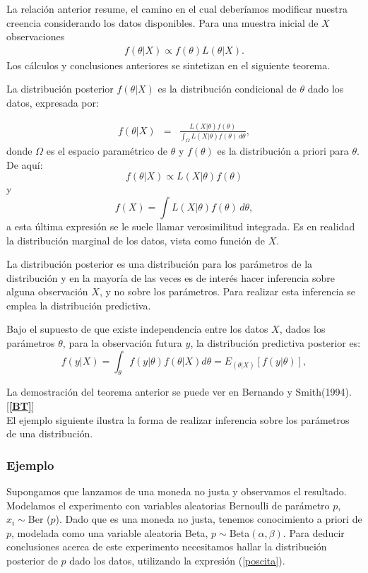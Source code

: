 \noindent La relaci\'on anterior resume, el camino en el cual deber\'iamos modificar nuestra creencia considerando los datos disponibles. Para una muestra inicial de $X$ observaciones 
\begin{eqnarray}
f(\theta|X)\propto f(\theta)L(\theta|X).\label{poscita}
\end{eqnarray}
\noindent Los c\'alculos y conclusiones anteriores se sintetizan en el siguiente teorema.
\begin{thm}
La distribuci\'on posterior $f(\theta|X)$ es la distribuci\'on condicional de $\theta$ dado los datos, expresada por:

\begin{eqnarray*}
f(\theta|X)&=&\frac{L(X|\theta)f(\theta)}{\int_{\Omega} L(X|\theta)f(\theta)\,d\theta},
\end{eqnarray*}
donde $\Omega$ es el espacio param\'etrico de $\theta$ y $f(\theta)$ es la distribuci\'on a priori para  $\theta$.\\[0.2cm]
De aqu\'i:
$$f(\theta|X)\propto L(X|\theta)f(\theta)$$
y
$$f(X)=\int L(X|\theta)f(\theta)\,d\theta,$$
a esta \'ultima expresi\'on se le suele llamar verosimilitud integrada. Es en realidad la distribuci\'on marginal de los datos, vista como funci\'on de $X$.
\end{thm}

\noindent La distribuci\'on posterior es  una distribuci\'on para los par\'ametros de la distribuci\'on y en la mayor\'ia de las veces es de inter\'es hacer inferencia sobre alguna observaci\'on $X$, y no sobre los par\'ametros. Para realizar esta inferencia se emplea la distribuci\'on predictiva.

 \begin{thm}
 Bajo el supuesto de que existe independencia entre los datos $X$, dados los par\'ametros $\theta$, para la observaci\'on futura $y$, la distribuci\'on predictiva posterior es:
 $$f(y|X)=\int_{\theta} f(y|\theta)f(\theta|X) d\theta=E_{(\theta|X)}[f(y|\theta)],$$
 \end{thm}

\noindent La demostraci\'on del teorema anterior se puede ver en Bernando y Smith(1994). [{\bf \ref{BT}}]\\[0.1cm]
\noindent El ejemplo siguiente ilustra la forma de realizar inferencia sobre los par\'ametros de una distribuci\'on.

\subsubsection{Ejemplo}
\noindent Supongamos que lanzamos de una moneda  no justa y observamos el resultado. Modelamos el experimento con variables aleatorias Bernoulli de par\'ametro $p$, $x_i\sim$Ber ($p$). Dado que es una moneda no justa, tenemos conocimiento a priori de $p$, modelada como una variable aleatoria Beta, $p\sim$Beta$(\alpha, \beta)$. Para deducir conclusiones acerca de este experimento necesitamos hallar la distribuci\'on posterior de $p$ dado los datos, utilizando la expresi\'on (\ref{poscita}).\\


